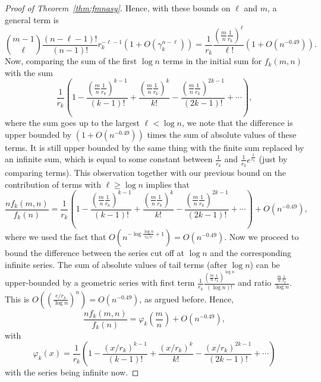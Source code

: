 \documentclass{amsart}
\theoremstyle{definition}
\begin{document}
\begin{proof}[Proof of Theorem~\ref{thm:fmnasy}]
Hence, with these bounds on $\ell$ and $m$, a general term is
\[\binom{m-1}{\ell}\frac{(n-\ell-1)!}{(n-1)!}r_k^{-\ell-1}\left(1+O(\gamma_k^{n-\ell})\right)=\frac{1}{r_k}\frac{\left(\frac{m}{n}\frac{1}{r_k}\right)^\ell}{\ell!}\left(1+O\left(n^{-0.49}\right)\right).\]
Now, comparing the sum of the first $\log n$ terms in the initial sum for $f_k(m,n)$ with the sum
\[\frac{1}{r_k}\left(1-\frac{\left(\frac{m}{n}\frac{1}{r_k}\right)^{k-1}}{(k-1)!}+\frac{\left(\frac{m}{n}\frac{1}{r_k}\right)^k}{k!}-\frac{\left(\frac{m}{n}\frac{1}{r_k}\right)^{2k-1}}{(2k-1)!}+\cdots\right),\]
where the sum goes up to the largest $\ell<\log n$, we note that the difference is upper bounded by $\left(1+O\left(n^{-0.49}\right)\right)$ times the sum of absolute values of these terms. It is still upper bounded by the same thing with the finite sum replaced by an infinite sum, which is equal to some constant between $\frac{1}{r_k}$ and $\frac{1}{r_k}e^{\frac{1}{r_k}}$ (just by comparing terms). This observation together with our previous bound on the contribution of terms with $\ell\geq \log n$ implies that
\[\frac{nf_k(m,n)}{f_k(n)}=\frac{1}{r_k}\left(1-\frac{\left(\frac{m}{n}\frac{1}{r_k}\right)^{k-1}}{(k-1)!}+\frac{\left(\frac{m}{n}\frac{1}{r_k}\right)^k}{k!}-\frac{\left(\frac{m}{n}\frac{1}{r_k}\right)^{2k-1}}{(2k-1)!}+\cdots\right)+O(n^{-0.49}),\]
where we used the fact that $O\left(n^{-\log \frac{\log n}{r_k/e}+1}\right)=O(n^{-0.49})$. Now we proceed to bound the difference between the series cut off at $\log n$ and the corresponding infinite series. The sum of absolute values of tail terms (after $\log n$) can be upper-bounded by a geometric series with first term $\frac{1}{r_k}\frac{\left(\frac{m}{n}\frac{1}{r_k}\right)^{\log n}}{(\log n)!}$ and ratio $\frac{\frac{m}{n}\frac{1}{r_k}}{\log n}$. This is $O\left(\left(\frac{e/r_k}{\log n}\right)^n\right)=O(n^{-0.49})$, as argued before. Hence,
\[\frac{nf_k(m,n)}{f_k(n)}=\varphi_k\left(\frac{m}{n}\right)+O(n^{-0.49}),\]
with
\[\varphi_k(x)=\frac{1}{r_k}\left(1-\frac{\left(x/r_k\right)^{k-1}}{(k-1)!}+\frac{\left(x/r_k\right)^k}{k!}-\frac{\left(x/r_k\right)^{2k-1}}{(2k-1)!}+\cdots\right)\]
with the series being infinite now.


\end{proof}
\end{document}
